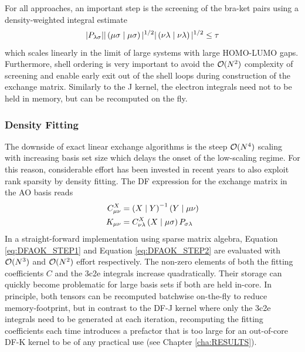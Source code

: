 For all approaches, an important step is the screening of the bra-ket pairs using a density-weighted integral estimate
\begin{equation}
|P_{\lambda\sigma}||\left( \mu\sigma \mid \mu\sigma \right)|^{1/2} |\left( \nu\lambda \mid \nu\lambda \right)|^{1/2} \leq \tau
\end{equation}
\noindent which scales linearly in the limit of large systems with large HOMO-LUMO gaps. Furthermore, shell ordering is very important to avoid the $\mathcal{O}(N^{2})$ complexity of screening and enable early exit out of the shell loops during construction of the exchange matrix. Similarly to the J kernel, the electron integrals need not to be held in memory, but can be recomputed on the fly.


\subsubsection{Density Fitting}

The downside of exact linear exchange algorithms is the steep $\mathcal{O}(N^{4})$ scaling with increasing basis set size which delays the onset of the low-scaling regime. For this reason, considerable effort has been invested in recent years to also exploit rank sparsity by density fitting. The DF expression for the exchange matrix in the AO basis reads
\begin{align}
C^X_{\mu\nu} &= \left( X \mid Y \right)^{-1} \left( Y \mid \mu\nu \right) \label{eq:DFAOK_STEP1}\\
K_{\mu\nu} &= C^X_{\nu\lambda} \left( X \mid \mu \sigma \right) P_{\sigma\lambda} \label{eq:DFAOK_STEP2}
\end{align}
\noindent In a straight-forward implementation using sparse matrix algebra, Equation \ref{eq:DFAOK_STEP1} and Equation \ref{eq:DFAOK_STEP2} are evaluated with $\mathcal{O}(N^{3})$  and $\mathcal{O}(N^{2})$ effort respectively. The non-zero elements of both the fitting coefficients $C$ and the 3c2e integrals increase quadratically. Their storage can quickly become problematic for large basis sets if both are held in-core. In principle, both tensors can be recomputed batchwise on-the-fly to reduce memory-footprint, but in contrast to the DF-J kernel where only the 3c2e integrals need to be generated at each iteration, recomputing the fitting coefficients each time introduces a prefactor that is too large for an out-of-core DF-K kernel to be of any practical use (see Chapter \ref{cha:RESULTS}).

